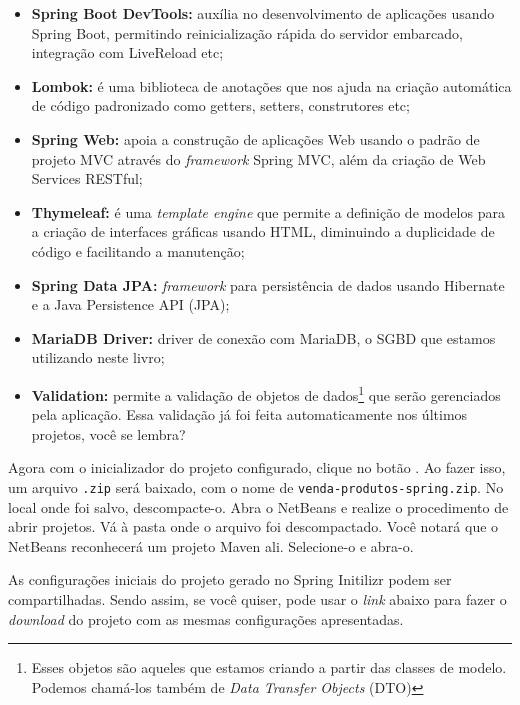 \begin{itemize}

    \item \textbf{Spring Boot DevTools:} auxília no desenvolvimento de aplicações usando Spring Boot, permitindo reinicialização rápida do servidor embarcado, integração com LiveReload etc;
    
    \item \textbf{Lombok:} é uma biblioteca de anotações que nos ajuda na criação automática de código padronizado como getters, setters, construtores etc;
    
    \item \textbf{Spring Web:} apoia a construção de aplicações Web usando o padrão de projeto MVC através do \textit{framework} Spring MVC, além da criação de Web Services RESTful;
    
    \item \textbf{Thymeleaf:} é uma \textit{template engine} que permite a definição de modelos para a criação de interfaces gráficas usando HTML, diminuindo a duplicidade de código e facilitando a manutenção;
    
    \item \textbf{Spring Data JPA:} \textit{framework} para persistência de dados usando Hibernate e a Java Persistence API (JPA);
    
    \item \textbf{MariaDB Driver:} driver de conexão com MariaDB, o SGBD que estamos utilizando neste livro;
    
    \item \textbf{Validation:} permite a validação de objetos de dados\footnote{Esses objetos são aqueles que estamos criando a partir das classes de modelo. Podemos chamá-los também de \textit{Data Transfer Objects} (DTO)} que serão gerenciados pela aplicação. Essa validação já foi feita automaticamente nos últimos projetos, você se lembra?
    
\end{itemize}

Agora com o inicializador do projeto configurado, clique no botão . Ao fazer isso, um arquivo \texttt{.zip} será baixado, com o nome de \texttt{venda-produtos-spring.zip}. No local onde foi salvo, descompacte-o. Abra o NetBeans e realize o procedimento de abrir projetos. Vá à pasta onde o arquivo foi descompactado. Você notará que o NetBeans reconhecerá um projeto Maven ali. Selecione-o e abra-o.

As configurações iniciais do projeto gerado no Spring Initilizr podem ser compartilhadas. Sendo assim, se você quiser, pode usar o \textit{link} abaixo para fazer o \textit{download} do projeto com as mesmas configurações apresentadas.

